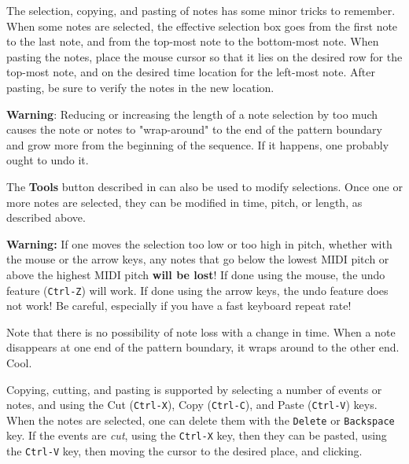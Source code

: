    The selection, copying, and pasting of notes has some minor tricks to
   remember.  When some notes are selected, the effective selection box
   goes from the first note to the last note, and from the top-most note to the
   bottom-most note.
   When pasting the notes, place the mouse cursor so that it lies on the
   desired row for the top-most note, and on the desired time location for the
   left-most note.  After pasting, be sure to verify the notes in the new
   location.

   \textbf{Warning}:  Reducing or increasing the length of a note selection
   by too much causes the note or notes to "wrap-around" to the end
   of the pattern boundary and grow more from the beginning of the sequence. 
   If it happens, one probably ought to undo it.

   The \textbf{Tools} button described in
    can also be used to
   modify selections.
   Once one or more notes are selected, they can be modified in time,
   pitch, or length, as described above.

   \textbf{Warning:}
   If one moves the selection too low or too high in pitch, whether with the
   mouse or the arrow keys, any notes that go below the lowest MIDI pitch or
   above the highest MIDI pitch \textbf{will be lost}!
   If done using the mouse, the undo feature (\texttt{Ctrl-Z}) will work.
   If done using the arrow keys, the undo feature does not work!
   Be careful, especially if you have a fast keyboard repeat rate!

   Note that there is no possibility of note loss with a change in time.  When
   a note disappears at one end of the pattern boundary, it wraps around to the
   other end.  Cool.

   Copying, cutting, and pasting is supported by selecting a number of events
   or notes, and using the
    Cut (\texttt{Ctrl-X}), 
    Copy (\texttt{Ctrl-C}), and
    Paste (\texttt{Ctrl-V})
   keys.
   When the notes are selected,
   one can delete them with the \texttt{Delete} or \texttt{Backspace} key.
   If the events are \textsl{cut}, using the \texttt{Ctrl-X} key, then
   they can be pasted, using the \texttt{Ctrl-V} key, then
   moving the cursor to the desired place, and clicking.

